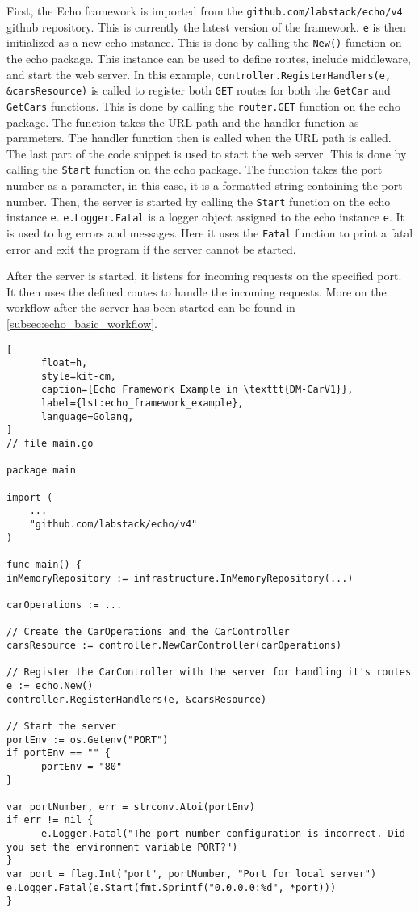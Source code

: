 First, the Echo framework is imported from the \texttt{github.com/labstack/echo/v4} github repository.
This is currently the latest version of the framework.
\texttt{e} is then initialized as a new echo instance.
This is done by calling the \texttt{New()} function on the echo package.
This instance can be used to define routes, include middleware, and start the web server.
In this example, \texttt{controller.RegisterHandlers(e, \&carsResource)} is called to register both \texttt{GET} routes for both the \texttt{GetCar} and \texttt{GetCars} functions.
This is done by calling the \texttt{router.GET} function on the echo package.
The function takes the URL path and the handler function as parameters.
The handler function then is called when the URL path is called.
The last part of the code snippet is used to start the web server.
This is done by calling the \texttt{Start} function on the echo package.
The function takes the port number as a parameter, in this case, it is a formatted string containing the port number.
Then, the server is started by calling the \texttt{Start} function on the echo instance \texttt{e}.
\texttt{e.Logger.Fatal} is a logger object assigned to the echo instance \texttt{e}.
It is used to log errors and messages.
Here it uses the \texttt{Fatal} function to print a fatal error and exit the program if the server cannot be started.

After the server is started, it listens for incoming requests on the specified port.
It then uses the defined routes to handle the incoming requests.
More on the workflow after the server has been started can be found in \autoref*{subsec:echo_basic_workflow}.

\begin{lstlisting}[
      float=h,
      style=kit-cm,
      caption={Echo Framework Example in \texttt{DM-CarV1}},
      label={lst:echo_framework_example},
      language=Golang,
]
// file main.go

package main

import (
	...
	"github.com/labstack/echo/v4"
)

func main() {
inMemoryRepository := infrastructure.InMemoryRepository(...)

carOperations := ...

// Create the CarOperations and the CarController
carsResource := controller.NewCarController(carOperations)

// Register the CarController with the server for handling it's routes
e := echo.New()
controller.RegisterHandlers(e, &carsResource)

// Start the server
portEnv := os.Getenv("PORT")
if portEnv == "" {
      portEnv = "80"
}

var portNumber, err = strconv.Atoi(portEnv)
if err != nil {
      e.Logger.Fatal("The port number configuration is incorrect. Did you set the environment variable PORT?")
}
var port = flag.Int("port", portNumber, "Port for local server")
e.Logger.Fatal(e.Start(fmt.Sprintf("0.0.0.0:%d", *port)))
}
\end{lstlisting}

